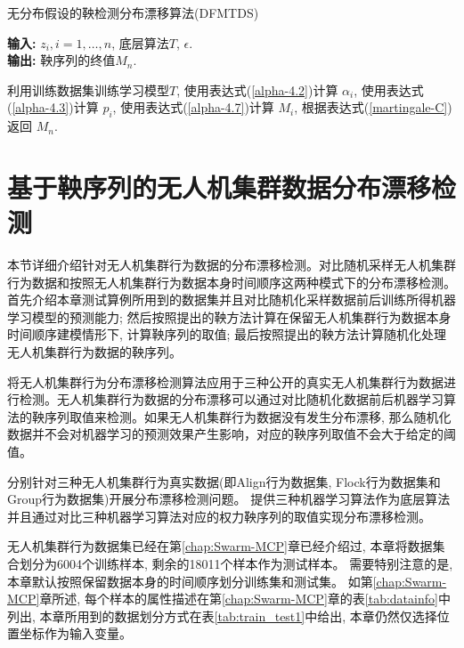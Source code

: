 \begin{algorithm}[!htbp]
    \small
    \caption{无分布假设的鞅检测分布漂移算法(DFMTDS)}
    \label{alg:on-line-testing}
    \hspace*{\algorithmicindent} \textbf{输入:} {$z_{i}, i=1,\ldots,n$, 底层算法$T$, $\epsilon$.}\\
    \hspace*{\algorithmicindent} \textbf{输出:} {鞅序列的终值$M_{n}$.}
    \begin{algorithmic}[1]
        \State 利用训练数据集训练学习模型$T$,
        \State 使用表达式(\ref{alpha-4.2})计算 $\alpha_i$,
        \State 使用表达式(\ref{alpha-4.3})计算 $p_i$,
        \State 使用表达式(\ref{alpha-4.7})计算 $M_{i}$,
        \EndFor
        \State 根据表达式(\ref{martingale-C})返回 $M_{n}$.
        \EndWhile
        \EndProcedure
    \end{algorithmic}
\end{algorithm}

\section{基于鞅序列的无人机集群数据分布漂移检测}
\label{empiricaldtudies}
本节详细介绍针对无人机集群行为数据的分布漂移检测。对比随机采样无人机集群行为数据和按照无人机集群行为数据本身时间顺序这两种模式下的分布漂移检测。首先介绍本章测试算例所用到的数据集并且对比随机化采样数据前后训练所得机器学习模型的预测能力; 然后按照提出的鞅方法计算在保留无人机集群行为数据本身时间顺序建模情形下, 计算鞅序列的取值; 最后按照提出的鞅方法计算随机化处理无人机集群行为数据的鞅序列。

将无人机集群行为分布漂移检测算法应用于三种公开的真实无人机集群行为数据进行检测。无人机集群行为数据的分布漂移可以通过对比随机化数据前后机器学习算法的鞅序列取值来检测。如果无人机集群行为数据没有发生分布漂移, 那么随机化数据并不会对机器学习的预测效果产生影响，对应的鞅序列取值不会大于给定的阈值。

分别针对三种无人机集群行为真实数据(即Align行为数据集, Flock行为数据集和Group行为数据集)开展分布漂移检测问题。 提供三种机器学习算法作为底层算法并且通过对比三种机器学习算法对应的权力鞅序列的取值实现分布漂移检测。

无人机集群行为数据集已经在第\ref{chap:Swarm-MCP}章已经介绍过, 本章将数据集合划分为6004个训练样本, 剩余的18011个样本作为测试样本。 需要特别注意的是, 本章默认按照保留数据本身的时间顺序划分训练集和测试集。 如第\ref{chap:Swarm-MCP}章所述, 每个样本的属性描述在第\ref{chap:Swarm-MCP}章的表\ref{tab:datainfo}中列出, 本章所用到的数据划分方式在表\ref{tab:train_test1}中给出, 本章仍然仅选择位置坐标作为输入变量。

